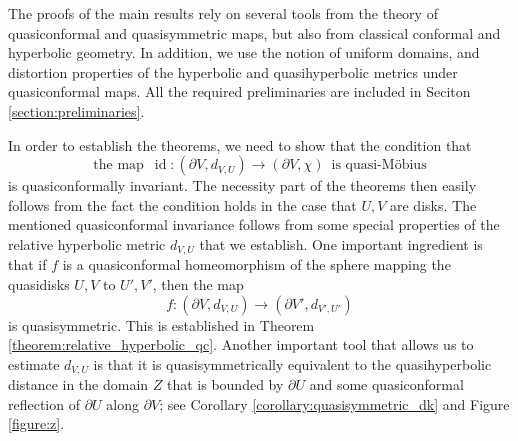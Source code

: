 \documentclass[letterpaper]{amsart}
\theoremstyle{plain}
\theoremstyle{definition}
\theoremstyle{remark}
\numberwithin{equation}{section}
\numberwithin{theorem}{section}
\DeclareMathOperator{\id}{id}
\begin{document}
The proofs of the main results rely on several tools from the theory of quasiconformal and quasisymmetric maps, but also from classical conformal and hyperbolic geometry. In addition, we use the notion of uniform domains, and distortion properties of the hyperbolic and quasihyperbolic metrics under quasiconformal maps. All the required preliminaries are included in Seciton \ref{section:preliminaries}. 

In order to establish the theorems, we need to show that the condition that 
$$\text{the map}\,\,\,\id\colon (\partial V,d_{V,U})\to (\partial V,\chi)\,\,\, \text{is quasi-M\"obius}$$
is quasiconformally invariant. The necessity part of the theorems then easily follows from the fact the condition holds in the case that $U,V$ are disks. The mentioned quasiconformal invariance follows from some special properties of the relative hyperbolic metric $d_{V,U}$ that we establish. One important ingredient is that if $f$ is a quasiconformal homeomorphism of the sphere mapping the quasidisks $U,V$ to $U',V'$, then the map 
$$f\colon (\partial V,d_{V,U})\to (\partial V',d_{V',U'})$$
is quasisymmetric. This is established in Theorem \ref{theorem:relative_hyperbolic_qc}. Another important tool that allows us to estimate $d_{V,U}$ is that it is quasisymmetrically equivalent to the quasihyperbolic distance in the domain $Z$ that is bounded by $\partial U$ and some quasiconformal reflection of $\partial U$ along $\partial V$; see Corollary \ref{corollary:quasisymmetric_dk} and Figure \ref{figure:z}. 
\end{document}
